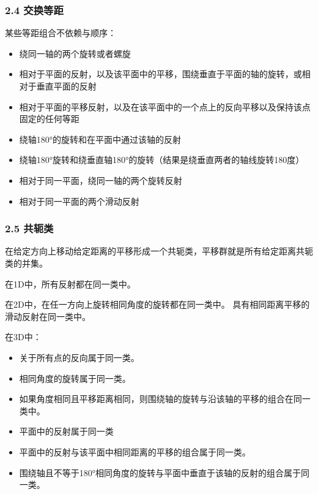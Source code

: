 \subsubsection{2.4 交换等距}

某些等距组合不依赖与顺序：

\begin{itemize}
\item 绕同一轴的两个旋转或者螺旋
\item 相对于平面的反射，以及该平面中的平移，围绕垂直于平面的轴的旋转，或相对于垂直平面的反射
\item 相对于平面的平移反射，以及在该平面中的一个点上的反向平移以及保持该点固定的任何等距
\item 绕轴180°的旋转和在平面中通过该轴的反射
\item 绕轴180°旋转和绕垂直轴180°的旋转（结果是绕垂直两者的轴线旋转180度）
\item 相对于同一平面，绕同一轴的两个旋转反射
\item 相对于同一平面的两个滑动反射
\end{itemize}


\subsubsection{2.5 共轭类}

在给定方向上移动给定距离的平移形成一个共轭类，平移群就是所有给定距离共轭类的并集。

在1D中，所有反射都在同一类中。

在2D中，在任一方向上旋转相同角度的旋转都在同一类中。 具有相同距离平移的滑动反射在同一类中。

在3D中：

\begin{itemize}
\item 关于所有点的反向属于同一类。
\item 相同角度的旋转属于同一类。
\item 如果角度相同且平移距离相同，则围绕轴的旋转与沿该轴的平移的组合在同一类中。
\item 平面中的反射属于同一类
\item 平面中的反射与该平面中相同距离的平移的组合属于同一类。
\item 围绕轴且不等于180°相同角度的旋转与平面中垂直于该轴的反射的组合属于同一类。
\end{itemize}


